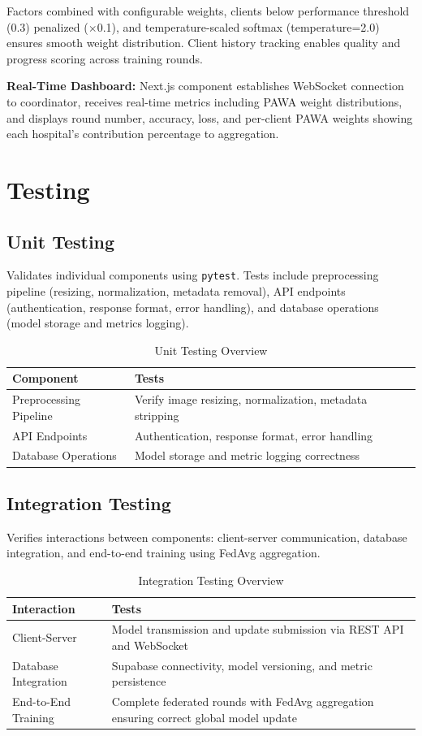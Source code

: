 Factors combined with configurable weights, clients below performance threshold (0.3) penalized ($\times$0.1), and temperature-scaled softmax (temperature=2.0) ensures smooth weight distribution. Client history tracking enables quality and progress scoring across training rounds.

\textbf{Real-Time Dashboard:} Next.js component establishes WebSocket connection to coordinator, receives real-time metrics including PAWA weight distributions, and displays round number, accuracy, loss, and per-client PAWA weights showing each hospital's contribution percentage to aggregation.
\section{Testing}

\subsection{Unit Testing}
Validates individual components using \texttt{pytest}. Tests include preprocessing pipeline (resizing, normalization, metadata removal), API endpoints (authentication, response format, error handling), and database operations (model storage and metrics logging).

\begin{table}[H]
\centering
\caption{Unit Testing Overview}
\begin{tabular}{|l|p{10cm}|}
\hline
\textbf{Component} & \textbf{Tests} \\ \hline
Preprocessing Pipeline & Verify image resizing, normalization, metadata stripping \\ \hline
API Endpoints & Authentication, response format, error handling \\ \hline
Database Operations & Model storage and metric logging correctness \\ \hline
\end{tabular}
\end{table}

\subsection{Integration Testing}
Verifies interactions between components: client-server communication, database integration, and end-to-end training using FedAvg aggregation.

\begin{table}[H]
\centering
\caption{Integration Testing Overview}
\begin{tabular}{|l|p{10cm}|}
\hline
\textbf{Interaction} & \textbf{Tests} \\ \hline
Client-Server & Model transmission and update submission via REST API and WebSocket \\ \hline
Database Integration & Supabase connectivity, model versioning, and metric persistence \\ \hline
End-to-End Training & Complete federated rounds with FedAvg aggregation ensuring correct global model update \\ \hline
\end{tabular}
\end{table}

